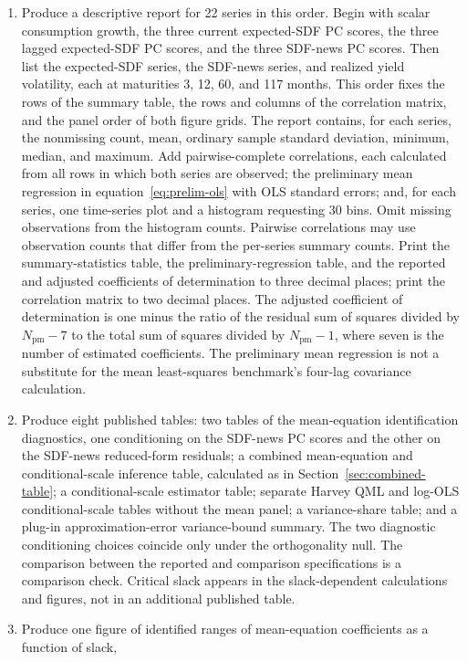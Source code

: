 \documentclass[11pt]{article}
\begin{document}
\begin{enumerate}
\item Produce a descriptive report for 22 series in this order. Begin with scalar consumption
growth, the three current expected-SDF PC scores, the three lagged expected-SDF PC scores, and the
three SDF-news PC scores. Then list the expected-SDF series, the SDF-news series, and realized yield volatility, each
at maturities 3, 12, 60, and 117 months. This order fixes the
rows of the summary table, the rows and columns of the correlation matrix, and the panel order of
both figure grids. The report contains, for each series, the nonmissing count, mean, ordinary sample
standard deviation, minimum, median, and maximum. Add pairwise-complete correlations, each calculated
from all rows in which both series are observed; the
preliminary mean regression in equation~\eqref{eq:prelim-ols} with OLS standard errors; and, for
each series, one time-series plot and a histogram requesting 30 bins. Omit missing observations from
the histogram counts. Pairwise correlations may use
observation counts that differ from the per-series summary counts. Print the summary-statistics
table, the preliminary-regression table, and the reported and adjusted coefficients of determination
to three decimal places; print the correlation matrix to two decimal places. The adjusted coefficient of determination
is one minus the ratio of the residual sum of squares divided by \(N_{\mathrm{pm}}-7\) to the total
sum of squares divided by \(N_{\mathrm{pm}}-1\), where seven is the number of estimated
coefficients. The preliminary mean regression is not a substitute for the mean least-squares
benchmark's four-lag covariance calculation.
\item Produce eight published tables: two tables of the mean-equation identification diagnostics,
one conditioning on the SDF-news PC scores and the other on the SDF-news reduced-form residuals;
a combined mean-equation and conditional-scale inference table, calculated as in
Section~\ref{sec:combined-table}; a conditional-scale estimator table; separate Harvey QML and
log-OLS conditional-scale tables without the mean panel; a variance-share table; and a plug-in approximation-error variance-bound summary. The two diagnostic
conditioning choices coincide only under the orthogonality null. The
comparison between the reported and comparison specifications is a comparison check. Critical slack appears
in the slack-dependent calculations and figures, not in an additional published table.
\item Produce one figure of identified ranges of mean-equation coefficients as a function of slack,

\end{enumerate}
\end{document}
